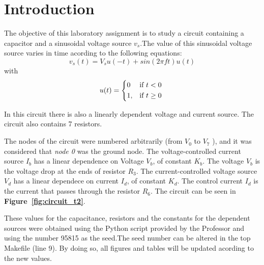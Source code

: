 \section{Introduction}
\label{sec:introduction}

\par The objective of this laboratory assignment is to study a circuit containing a capacitor and a sinusoidal voltage source $v_s$.The value of this sinusoidal voltage source varies in time acording to the following equations: 
\begin {equation}
	v_s( t)  = V_s u(-t) + sin( 2 \pi f t ) u( t)
	\label{eq:n1}
\end{equation}
 with 
\begin {equation}
	u( t ) =  
	\begin{cases*} 
	  0 & if $t < 0$ \\
	1, & if $t \geq 0$
	\end{cases*}
	\label{eq:n2}
\end{equation}

In this circuit there is also a linearly dependent voltage and current source. The circuit also contains 7 resistors.\par
The nodes of the circuit were numbered arbitrarily (from {\it$V_{0}$}  to {\it$V_{7}$} ), and it was considered that {\it node 0} was the ground node. The voltage-controlled current source {\it $I_b$} has a linear dependence on Voltage {\it $V_b$}, of constant {\it $K_b$}. The voltage {\it $V_b$} is the voltage drop at the ends of resistor {\it $R_3$}. The current-controlled voltage source {\it $V_d$} has a linear dependece on current {\it $I_d$}, of constant {\it $K_d$}. The control current {\it $I_d$} is the current that passes through the resistor {\it $R_6$}.
The circuit can be seen in \textbf{Figure~\ref{fig:circuit_t2}}.\par
These values for the capacitance, resistors and the constants for the dependent sources were obtained using the
Python script provided by the Professor 
and using the number 95815 as the seed.The seed number can be altered in the top Makefile (line 9). By doing so, all figures and tables will be updated acording to the new values. \par

